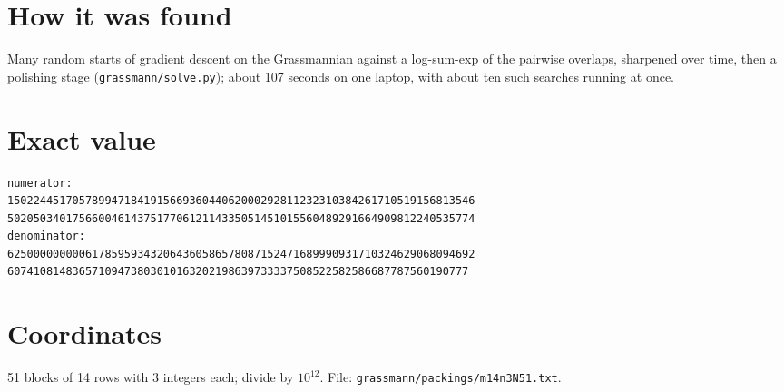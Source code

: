 \documentclass[11pt,a4paper]{article}
\begin{document}
\section{How it was found}
Many random starts of gradient descent on the Grassmannian against a log-sum-exp of the pairwise overlaps, sharpened over time, then a polishing stage (\texttt{grassmann/solve.py}); about 107 seconds on one laptop, with about ten such searches running at once.


\appendix
\section{Exact value}
{\small
\begin{verbatim}
numerator:
150224451705789947184191566936044062000292811232310384261710519156813546
502050340175660046143751770612114335051451015560489291664909812240535774
denominator:
625000000000617859593432064360586578087152471689990931710324629068094692
60741081483657109473803010163202198639733337508522582586687787560190777
\end{verbatim}}

\section{Coordinates}
51 blocks of 14 rows with 3 integers each; divide by $10^{12}$. File: \texttt{grassmann/packings/m14n3N51.txt}.
{\tiny
\begin{multicols}{3}
\end{multicols}}
\end{document}
